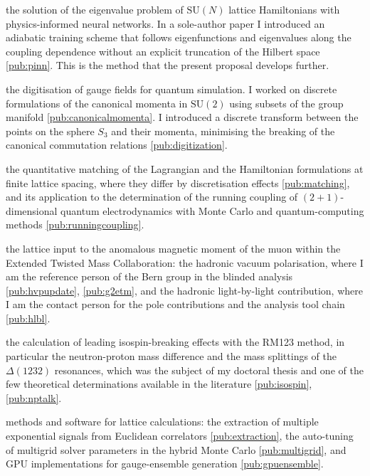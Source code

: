 \begin{tightitemize}
  \item the solution of the eigenvalue problem of $\mathrm{SU}(N)$ lattice Hamiltonians with physics-informed
  neural networks. In a sole-author paper I introduced an adiabatic training scheme that follows eigenfunctions
  and eigenvalues along the coupling dependence without an explicit truncation of the Hilbert space
  \ref{pub:pinn}. This is the method that the present proposal develops further.
  \item the digitisation of gauge fields for quantum simulation. I worked on discrete formulations of the canonical momenta in $\mathrm{SU}(2)$ using subsets of the group manifold \ref{pub:canonicalmomenta}.
  I introduced a discrete transform between the points on the sphere $S_3$ and their momenta, minimising the breaking of the canonical commutation relations \ref{pub:digitization}.
  \item the quantitative matching of the Lagrangian and the Hamiltonian formulations at finite lattice spacing,
  where they differ by discretisation effects \ref{pub:matching}, and its application to the determination of the running coupling
  of $(2+1)$-dimensional quantum electrodynamics with Monte Carlo and quantum-computing methods \ref{pub:runningcoupling}.
  \item the lattice input to the anomalous magnetic moment of the muon within the Extended Twisted Mass
  Collaboration: the hadronic vacuum polarisation, where I am the reference person of the Bern group in the
  blinded analysis \ref{pub:hvpupdate}, \ref{pub:g2etm}, and the hadronic light-by-light contribution, where I am the contact person for the pole contributions and the analysis tool
  chain \ref{pub:hlbl}.
  \item the calculation of leading isospin-breaking effects with the RM123 method, in particular the
  neutron-proton mass difference and the mass splittings of the $\Delta(1232)$ resonances, which was the
  subject of my doctoral thesis and one of the few theoretical determinations available in the literature
  \ref{pub:isospin}, \ref{pub:nptalk}.
  \item methods and software for lattice calculations: the extraction of multiple exponential signals from
  Euclidean correlators \ref{pub:extraction}, the auto-tuning of multigrid solver parameters in the hybrid Monte Carlo \ref{pub:multigrid}, and
  GPU implementations for gauge-ensemble generation \ref{pub:gpuensemble}.
\end{tightitemize}

